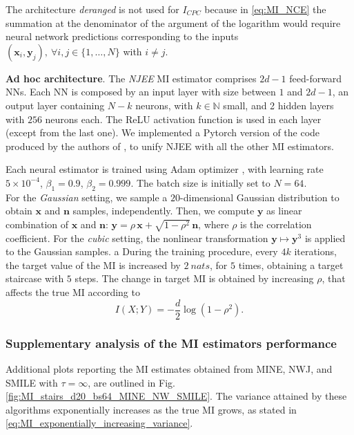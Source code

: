 The architecture \textit{deranged} is not used for $I_{CPC}$ because in \eqref{eq:MI_NCE} the summation at the denominator of the argument of the logarithm would require neural network predictions corresponding to the inputs $(\mathbf{x}_i, \mathbf{y}_j), \>  \forall i,j \in \{1,\dots,N\}$ with $i \neq j$.

\textbf{Ad hoc architecture}. The \textit{NJEE} MI estimator comprises $2d-1$ feed-forward NNs. Each NN is composed by an input layer with size between $1$ and $2d-1$, an output layer containing $N-k$ neurons, with $k \in \mathbb{N}$ small, and 2 hidden layers with $256$ neurons each. The ReLU activation function is used in each layer (except from the last one).
We implemented a Pytorch \cite{Pytorch2016} version of the 
code produced by the authors of \cite{shalev2022neural}, to unify NJEE with all the other MI estimators. 

Each neural estimator is trained using Adam optimizer \cite{kingma2014adam}, with learning rate $5 \times 10^{-4}$, $\beta_1 = 0.9$, $\beta_2=0.999$. The batch size is initially set to $N=64$.\\
For the \textit{Gaussian} setting, we sample a $20$-dimensional Gaussian distribution to obtain $\mathbf{x}$ and $\mathbf{n}$ samples, independently. Then, we compute $\mathbf{y}$ as linear combination of $\mathbf{x}$ and $\mathbf{n}$: $\mathbf{y} = \rho \, \mathbf{x} + \sqrt{1-\rho^2} \, \mathbf{n}$, where $\rho$ is the correlation coefficient. For the \textit{cubic} setting, the nonlinear transformation $\mathbf{y} \mapsto \mathbf{y}^3$ is applied to the Gaussian samples.
a
During the training procedure, every $4k$ iterations, the target value of the MI is increased by $2\> nats$, for $5$ times, obtaining a target staircase with $5$ steps. The change in target MI is obtained by increasing $\rho$, that affects the true MI according to
\begin{equation}
    I(X;Y) = -\frac{d}{2}\log(1 - \rho^2).
\end{equation}

\subsubsection{Supplementary analysis of the MI estimators performance}
Additional plots reporting the MI estimates obtained from MINE, NWJ, and SMILE with $\tau = \infty$, are outlined in Fig. \ref{fig:MI_stairs_d20_bs64_MINE_NW_SMILE}. The variance attained by these algorithms exponentially increases as the true MI grows, as stated in \eqref{eq:MI_exponentially_increasing_variance}. 

